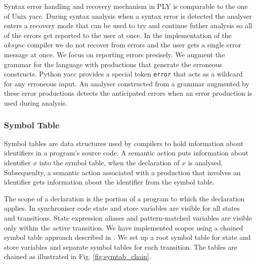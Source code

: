 Syntax error handling and recovery mechanism in PLY is comparable to the one of Unix yacc. During syntax analysis when a syntax error is detected the analyser enters a recovery mode that can be used to try and continue futher analysis so all of the errors get reported to the user at once. In the implementation of the $aksync$ compiler we do not recover from errors and the user gets a single error message at once. We focus on reporting errors presisely. We augment the grammar for the language with productions that generate the erroneous constructs. Python yacc provides a special token \texttt{error} that acts as a wildcard for any erroneous input. An analyser constructed from a grammar augmented by these error productions detects the anticipated errors when an error production is used during analysis.




  \subsubsection{Symbol Table}
Symbol tables are data structures used by compilers to hold information about identifiers in a program's source code. A semantic action puts information about identifier $x$ into the symbol table, when the declaration of $x$ is analysed. Subsequenlty, a semantic action associated with a production that involves an identifier gets information about the identifier from the symbol table.

The scope of a declaration is the portion of a program to which the declaration applies. In synchroniser code state and store variables are visible for all states and transitions. State expression aliases and pattern-matched variables are visible only within the active transition. We have implemented scopes using a chained symbol table approach described in \cite{dragonbook}. We set up a root symbol table for state and store variables and separate symbol tables for each transition. The tables are chained as illustrated in Fig. \ref{fig:symtab_chain}.

